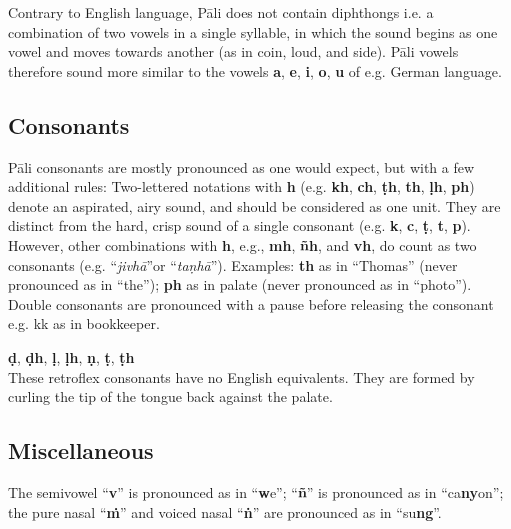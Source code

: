 Contrary to English language, Pāli does not contain diphthongs i.e. a combination of two vowels in a single syllable, in which the sound begins as one vowel and moves towards another (as in coin, loud, and side). Pāli vowels therefore sound more similar to the vowels \textbf{a}, \textbf{e}, \textbf{i}, \textbf{o}, \textbf{u} of e.g. German language.

\ifasixversion\vspace{-0.5cm}\fi

\subsection*{Consonants}

Pāli consonants are mostly pronounced as one would expect, but with a few additional rules:  Two-lettered notations with \textbf{h} (e.g. \textbf{kh}, \textbf{ch}, \textbf{ṭh}, \textbf{th}, \textbf{ḷh}, \textbf{ph}) denote an aspirated, airy sound, and should be considered as one unit. They are distinct from the hard, crisp sound of a single consonant (e.g. \textbf{k}, \textbf{c}, \textbf{ṭ}, \textbf{t}, \textbf{p}). However, other combinations with \textbf{h}, e.g., \textbf{mh}, \textbf{ñh}, and \textbf{vh}, do count as two consonants (e.g. ``\textit{jivhā}''or ``\textit{taṇhā}'').  Examples: \textbf{th} as in ``Thomas'' (never pronounced as in ``the''); \textbf{ph} as in palate (never pronounced as in ``photo''). Double consonants are pronounced with a pause before releasing the consonant e.g. kk as in bookkeeper.


\ifasixversion\vspace{-0.5cm}\fi


\textbf{ḍ}, \textbf{ḍh}, \textbf{ḷ}, \textbf{ḷh}, \textbf{ṇ}, \textbf{ṭ}, \textbf{ṭh}\\
These retroflex consonants have no English equivalents. They are formed by curling the tip of the tongue back against the palate.

\ifafiveversion\clearpage\fi
\ifasixversion\clearpage\fi

\subsection*{Miscellaneous}

The semivowel ``\textbf{v}'' is pronounced as in ``\textbf{w}e''; ``\textbf{ñ}'' is pronounced as in ``ca\textbf{ny}on''; the pure nasal ``\textbf{ṁ}'' and voiced nasal ``\textbf{ṅ}'' are pronounced as in ``su\textbf{ng}''.


